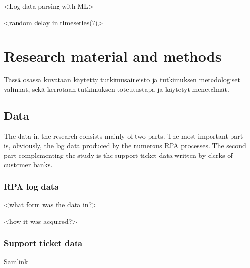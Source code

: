 \documentclass[english, 12pt, a4paper, elec, utf8, a-1b, online]{aaltothesis}
\begin{document}
<Log data parsing with ML>

<random delay in timeseries(?)>




\clearpage




\section{Research material and methods}

Tässä osassa kuvataan käytetty tutkimusaineisto ja
tutkimuksen metodologiset valinnat, sekä
kerrotaan tutkimuksen toteutustapa ja käytetyt menetelmät. 

\subsection{Data}
The data in the research consists mainly of two parts.
The most important part is,
obviously,
the log data produced by the numerous RPA processes.
The second part complementing the study
is the support ticket data written by clerks of customer banks.

\subsubsection*{RPA log data}
<what form was the data in?>

<how it was acquired?>

\subsubsection*{Support ticket data}
Samlink
\end{document}
